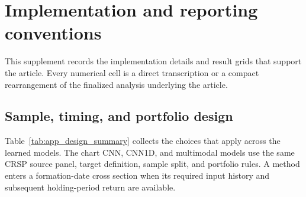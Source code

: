 \section{Implementation and reporting conventions}\label{app:implementation}

This supplement records the implementation details and result grids that support the article. Every numerical cell is a direct transcription or a compact rearrangement of the finalized analysis underlying the article.

\subsection{Sample, timing, and portfolio design}

Table~\ref{tab:app_design_summary} collects the choices that apply across the learned models. The chart CNN, CNN1D, and multimodal models use the same CRSP source panel, target definition, sample split, and portfolio rules. A method enters a formation-date cross section when its required input history and subsequent holding-period return are available.


